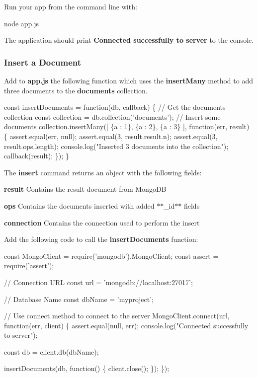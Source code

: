 Run your app from the command line with\+:


\begin{DoxyCode}
node app.js
\end{DoxyCode}


The application should print {\bfseries Connected successfully to server} to the console.

\subsubsection*{Insert a Document}

Add to {\bfseries app.\+js} the following function which uses the {\bfseries insert\+Many} method to add three documents to the {\bfseries documents} collection.


\begin{DoxyCode}
const insertDocuments = function(db, callback) \{
  // Get the documents collection
  const collection = db.collection('documents');
  // Insert some documents
  collection.insertMany([
    \{a : 1\}, \{a : 2\}, \{a : 3\}
  ], function(err, result) \{
    assert.equal(err, null);
    assert.equal(3, result.result.n);
    assert.equal(3, result.ops.length);
    console.log("Inserted 3 documents into the collection");
    callback(result);
  \});
\}
\end{DoxyCode}


The {\bfseries insert} command returns an object with the following fields\+:


\begin{DoxyItemize}
\item {\bfseries result} Contains the result document from Mongo\+DB
\item {\bfseries ops} Contains the documents inserted with added $\ast$$\ast$\+\_\+id$\ast$$\ast$ fields
\item {\bfseries connection} Contains the connection used to perform the insert
\end{DoxyItemize}

Add the following code to call the {\bfseries insert\+Documents} function\+:


\begin{DoxyCode}
const MongoClient = require('mongodb').MongoClient;
const assert = require('assert');

// Connection URL
const url = 'mongodb://localhost:27017';

// Database Name
const dbName = 'myproject';

// Use connect method to connect to the server
MongoClient.connect(url, function(err, client) \{
  assert.equal(null, err);
  console.log("Connected successfully to server");

  const db = client.db(dbName);

  insertDocuments(db, function() \{
    client.close();
  \});
\});
\end{DoxyCode}


